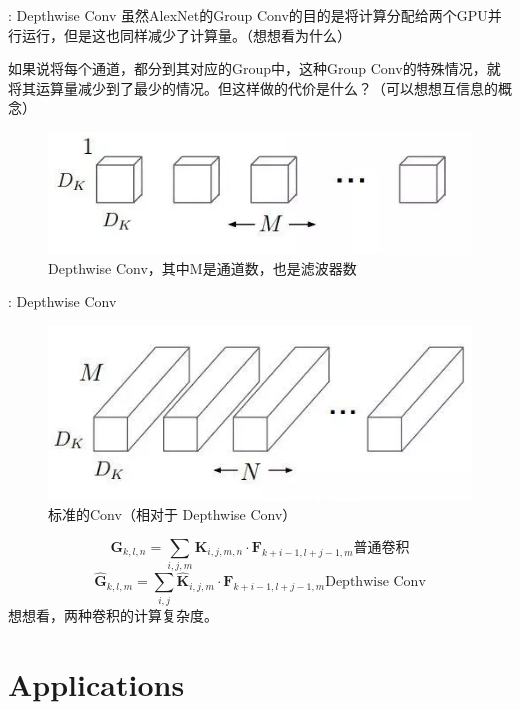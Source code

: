 \begin{frame}{\titleprefix: Depthwise Conv}
	虽然AlexNet的Group Conv的目的是将计算分配给两个GPU并行运行，但是这也同样减少了计算量。（想想看为什么）
	
	如果说将每个通道，都分到其对应的Group中，这种Group Conv的特殊情况，就将其运算量减少到了最少的情况。但这样做的代价是什么？（可以想想\alert{互信息}的概念）
\begin{figure}
	\centering
	\includegraphics[width=0.7\linewidth]{Images/depthwise_1}
	\caption{Depthwise Conv，其中M是通道数，也是滤波器数}
	\label{fig:depthwise1}
\end{figure}

\end{frame}

\begin{frame}{\titleprefix: Depthwise Conv}
	\begin{figure}
		\centering
		\includegraphics[width=0.5\linewidth]{Images/depthwise_2}
		\caption{标准的Conv（相对于 Depthwise Conv）}
		\label{fig:depthwise2}
	\end{figure}
	\[
\mathbf{G}_{k, l, n}=\sum_{i, j, m} \mathbf{K}_{i, j, m, n} \cdot \mathbf{F}_{k+i-1, l+j-1, m}
\text{普通卷积}
\]	
\[
\hat{\mathbf{G}}_{k, l, m}=\sum_{i, j} \hat{\mathbf{K}}_{i, j, m} \cdot \mathbf{F}_{k+i-1, l+j-1, m}
\text{Depthwise Conv}
\]
想想看，两种卷积的计算复杂度。
\end{frame}

\section{Applications}

